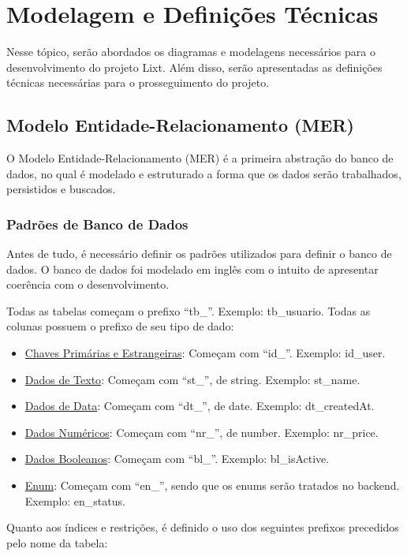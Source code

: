 \section{Modelagem e Definições Técnicas}

Nesse tópico, serão abordados os diagramas e modelagens necessários para o desenvolvimento do projeto Lixt. Além disso, serão apresentadas as definições técnicas necessárias para o prosseguimento do projeto.

\subsection{Modelo Entidade-Relacionamento (MER)}

O Modelo Entidade-Relacionamento (MER) é a primeira abstração do banco de dados, no qual é modelado e estruturado a forma que os dados serão trabalhados, persistidos e buscados.

\subsubsection{Padrões de Banco de Dados}

Antes de tudo, é necessário definir os padrões utilizados para definir o banco de dados. O banco de dados foi modelado em inglês com o intuito de apresentar coerência com o desenvolvimento.

Todas as tabelas começam o prefixo ``tb\_''. Exemplo: tb\_usuario. Todas as colunas possuem o prefixo de seu tipo de dado:

\begin{itemize}
	\item \underline{Chaves Primárias e Estrangeiras}: Começam com ``id\_''. Exemplo: id\_user.
	\item \underline{Dados de Texto}: Começam com ``st\_'', de string. Exemplo: st\_name.
	\item \underline{Dados de Data}: Começam com ``dt\_'', de date. Exemplo: dt\_createdAt.
	\item \underline{Dados Numéricos}: Começam com ``nr\_'', de number. Exemplo: nr\_price.  
		\item \underline{Dados Booleanos}: Começam com ``bl\_''. Exemplo: bl\_isActive.  
	\item \underline{Enum}: Começam com ``en\_'', sendo que os enums serão tratados no backend. Exemplo: en\_status.  
\end{itemize}

Quanto aos índices e restrições, é definido o uso dos seguintes prefixos precedidos pelo nome da tabela:

